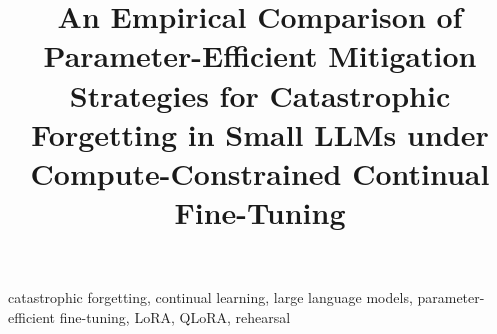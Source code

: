 \documentclass[conference]{IEEEtran}
\begin{document}
\title{An Empirical Comparison of Parameter-Efficient Mitigation\\
Strategies for Catastrophic Forgetting in Small LLMs under\\
Compute-Constrained Continual Fine-Tuning}

\author{
}

\maketitle



\begin{IEEEkeywords}
catastrophic forgetting, continual learning, large language models,
parameter-efficient fine-tuning, LoRA, QLoRA, rehearsal
\end{IEEEkeywords}











\end{document}
